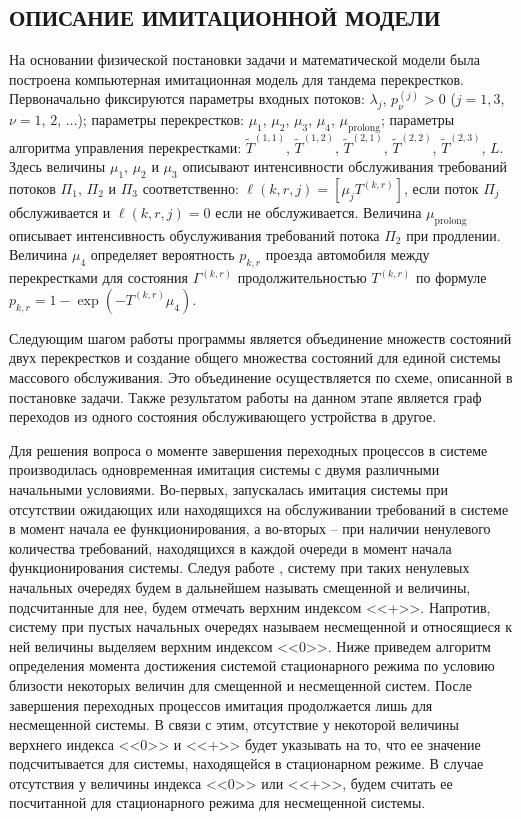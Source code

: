 \documentclass[11pt]{ubs}
\begin{document}
\subsection{ОПИСАНИЕ ИМИТАЦИОННОЙ МОДЕЛИ}
На основании физической постановки задачи и математической модели была построена компьютерная имитационная модель для тандема перекрестков. Первоначально фиксируются параметры входных потоков:
$\lambda_j$,  $p_{\nu}^{(j)}>0$ ($j=1,3$, $\nu=1$, $2$, $\ldots$); параметры перекрестков: $\mu_1$, $\mu_2$,  $\mu_3$, $\mu_4$, $\mu_{\mathrm{prolong}}$; параметры алгоритма управления перекрестками: $\widetilde T^{(1,1)}$, $\widetilde T^{(1,2)}$, $\widetilde T^{(2,1)}$, $\widetilde T^{(2,2)}$, $\widetilde T^{(2,3)}$, $L$. Здесь величины $\mu_1$, $\mu_2$ и $\mu_3$  описывают интенсивности обслуживания требований потоков $\Pi_1$, $\Pi_2$ и $\Pi_3$ соответственно: $\ell(k,r,j)=[\mu_j T^{(k,r)}]$, если  поток $\Pi_j$ обслуживается и $\ell(k,r,j)=0$ если не обслуживается. Величина $\mu_{\mathrm{prolong}}$ описывает интенсивность обуслуживания требований потока $\Pi_2$ при продлении. Величина $\mu_4$ определяет вероятность $p_{k,r}$ проезда автомобиля между перекрестками  для состояния $\Gamma^{(k,r)}$ продолжительностью $T^{(k,r)}$ по формуле $p_{k,r} = 1- \exp{(- T^{(k,r)} \mu_4)}$.  

Следующим шагом работы программы является объединение множеств состояний двух перекрестков и создание общего множества состояний для единой системы массового обслуживания. Это объединение осуществляется по схеме, описанной в постановке задачи. Также результатом работы на данном этапе является граф переходов из одного состояния обслуживающего устройства в другое.

Для решения вопроса о моменте завершения переходных процессов в системе производилась одновременная имитация системы с двумя различными начальными условиями. Во-первых, запускалась имитация системы при отсутствии ожидающих или находящихся на обслуживании требований в системе в момент начала ее функционирования, а во-вторых -- при наличии ненулевого количества требований, находящихся в каждой очереди в момент начала функционирования системы. Следуя работе \cite{Fedotkin:Rachinskaya:2016}, систему при таких ненулевых начальных очередях будем в дальнейшем называть смещенной и величины, подсчитанные для нее, будем отмечать верхним индексом <<+>>. Напротив, систему при пустых начальных очередях называем несмещенной и относящиеся к ней величины выделяем верхним индексом <<0>>. Ниже приведем алгоритм определения момента достижения системой стационарного режима по условию близости некоторых величин для смещенной и несмещенной систем. После завершения переходных процессов имитация продолжается лишь для несмещенной системы. В связи с этим, отсутствие у некоторой величины верхнего индекса <<0>> и <<+>> будет указывать на то, что ее значение подсчитывается для системы, находящейся в стационарном режиме. В случае отсутствия у величины индекса <<0>> или <<+>>, будем считать ее посчитанной для стационарного режима для несмещенной системы.
\end{document}
